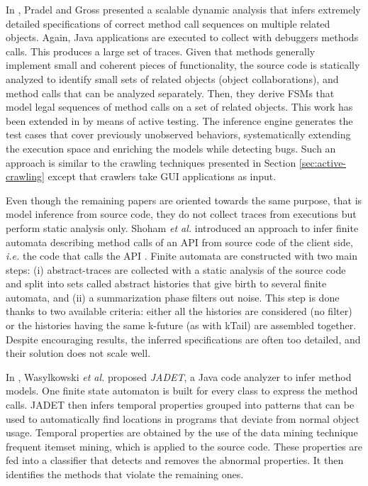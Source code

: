 In \cite{Pradel:2009}, Pradel and Gross presented a scalable
dynamic analysis that infers extremely detailed specifications of
correct method call sequences on multiple related objects. Again,
Java applications are executed to collect with debuggers methods
calls. This produces a large set of traces. Given that methods
generally implement small and coherent pieces of functionality,
the source code is statically analyzed to identify small sets of
related objects (object collaborations), and method calls that
can be analyzed separately. Then, they derive FSMs that model
legal sequences of method calls on a set of related objects. This
work has been extended in \cite{Dallmeier_generatingtest} by
means of active testing. The inference engine generates the test
cases that cover previously unobserved behaviors, systematically
extending the execution space and enriching the models while
detecting bugs. Such an approach is similar to the crawling
techniques presented in Section \ref{sec:active-crawling} except
that crawlers take GUI applications as input.

Even though the remaining papers are oriented towards the same
purpose, that is model inference from source code, they do not
collect traces from executions but perform static analysis only.
Shoham \emph{et al.} introduced an approach to infer finite automata
describing method calls of an API from source code of the client
side, \emph{i.e.} the code that calls the API
\cite{Shoham:2007:SSM:1273463.1273487}. Finite automata are
constructed with two main steps: (i) abstract-traces are
collected with a static analysis of the source code and split
into sets called abstract histories that give birth to several
finite automata, and (ii) a summarization phase filters out
noise. This step is done thanks to two available criteria: either
all the histories are considered (no filter) or the histories
having the same k-future (as with kTail) are assembled together.
Despite encouraging results, the inferred specifications are
often too detailed, and their solution does not scale well.

In \cite{Wasylkowski07detectingobject}, Wasylkowski \emph{et al.}
proposed \textit{JADET}, a Java code analyzer to infer method
models. One finite state automaton is built for every class to
express the method calls. JADET then infers temporal properties
grouped into patterns that can be used to automatically find
locations in programs that deviate from normal object usage.
Temporal properties are obtained by the use of the data mining
technique frequent itemset mining, which is applied to the source
code. These properties are fed into a classifier that detects and
removes the abnormal properties. It then identifies the methods
that violate the remaining ones.

